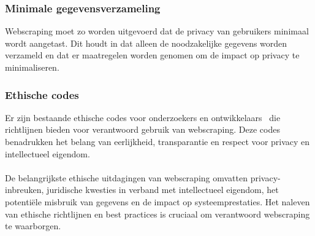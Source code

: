\subsubsection{Minimale gegevensverzameling}
Webscraping moet zo worden uitgevoerd dat de privacy van gebruikers minimaal wordt aangetast. Dit houdt in dat alleen de noodzakelijke gegevens worden verzameld en dat er maatregelen worden genomen om de impact op privacy te minimaliseren.

\subsubsection{Ethische codes}
Er zijn bestaande ethische codes voor onderzoekers en ontwikkelaars~\autocite{Don2018} die richtlijnen bieden voor verantwoord gebruik van webscraping. Deze codes benadrukken het belang van eerlijkheid, transparantie en respect voor privacy en intellectueel eigendom.
\\
\\
De belangrijkste ethische uitdagingen van webscraping omvatten privacy-inbreuken, juridische kwesties in verband met intellectueel eigendom, het potentiële misbruik van gegevens en de impact op systeemprestaties. Het naleven van ethische richtlijnen en best practices is cruciaal om verantwoord webscraping te waarborgen.